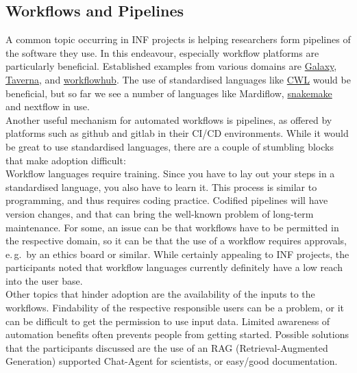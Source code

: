 \documentclass{eceasst}
\newcommand{\eg}{e.\,g.}
\begin{document}
\subsection{Workflows and Pipelines}
A common topic occurring in INF projects is helping researchers form pipelines of the software they use.
In this endeavour, especially workflow platforms are particularly beneficial.
Established examples from various domains are \href{https://galaxyproject.github.io/}{Galaxy}, \href{https://esciencelab.org.uk/products/taverna/}{Taverna}, and \href{https://workflowhub.eu/}{workflowhub}.
The use of standardised languages like \href{https://www.commonwl.org/}{CWL} would be beneficial, but so far we see a number of languages
like Mardiflow, \href{https://snakemake.readthedocs.io/en/stable/}{snakemake} and nextflow in use.\\
Another useful mechanism for automated workflows is pipelines,
as offered by platforms such as github and gitlab in their CI/CD environments.
While it would be great to use standardised languages, there are a couple of stumbling blocks that make adoption difficult:\\
Workflow languages require training.
Since you have to lay out your steps in a standardised language, you also have to learn it.
This process is similar to programming, and thus requires coding practice.
Codified pipelines will have version changes, and that can bring the well-known problem of long-term maintenance.
For some, an issue can be that workflows have to be permitted in the respective domain,
so it can be that the use of a workflow requires approvals, \eg~by an ethics board or similar.
While certainly appealing to INF projects, the participants noted that
workflow languages currently definitely have a low reach into the user base.\\
Other topics that hinder adoption are the availability of the inputs to the workflows.
Findability of the respective responsible users can be a problem, or
it can be difficult to get the permission to use input data.
Limited awareness of automation benefits often prevents people from getting started.
Possible solutions that the participants discussed are the use of an RAG (Retrieval-Augmented Generation) supported Chat-Agent for scientists,
or easy/good documentation.
\end{document}
